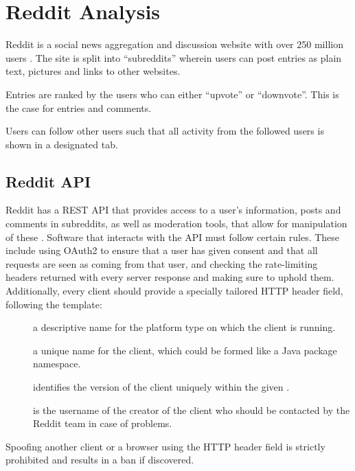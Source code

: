 \section{Reddit Analysis}\label{sec:reddit-analysis}

Reddit is a social news aggregation and discussion website with over 250 million
users \citep{AdvertiseOnReddit}. The site is split into ``subreddits'' wherein
users can post entries as plain text, pictures and links to other websites. \nl

Entries are ranked by the users who can either ``upvote'' or ``downvote''. This
is the case for entries and comments. \citep{AboutReddit}\nl

Users can follow other users such that all activity from the followed users is
shown in a designated tab.

\subsection{Reddit API}\label{subsec:reddit-api}

Reddit has a \ac{REST} \ac{API} that provides access to a user's information,
posts and comments in subreddits, as well as moderation tools, that allow for
manipulation of these \citep{RedditApi}. Software that interacts with the
\ac{API} must follow certain rules. These include using OAuth2 to ensure that a
user has given consent and that all requests are seen as coming from that user,
and checking the rate-limiting headers returned with every server response and
making sure to uphold them.
Additionally, every client should provide a specially tailored 
\ac{HTTP} header field, following the template: \citep{RedditApiRules}\nl

\begin{center}
\end{center}\nl
\begin{description}
  \item[] a descriptive name for the platform type on which the client is running.
  \item[] a unique name for the client, which could be formed like a Java package namespace.
  \item[] identifies the version of the client uniquely
  within the given .
  \item[] is the username of the creator of the client who should be contacted by the Reddit team
  in case of problems.
\end{description}\nl

Spoofing another client or a browser using the  \ac{HTTP} header field is strictly prohibited and
results in a ban if discovered. \citep{RedditApiRules}\nl